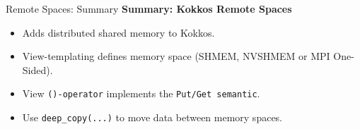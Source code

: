 
\begin{frame}{Remote Spaces: Summary}
\textbf{Summary: Kokkos Remote Spaces}
\vspace{10pt}
\begin{itemize}
   \item Adds distributed shared memory to Kokkos.
   \item View-templating defines memory space (SHMEM, NVSHMEM or MPI One-Sided).
   \item View \texttt{()-operator} implements the \texttt{Put/Get semantic}.
   \item Use \texttt{deep\_copy(...)} to move data between memory spaces.
\end{itemize}
\end{frame}

